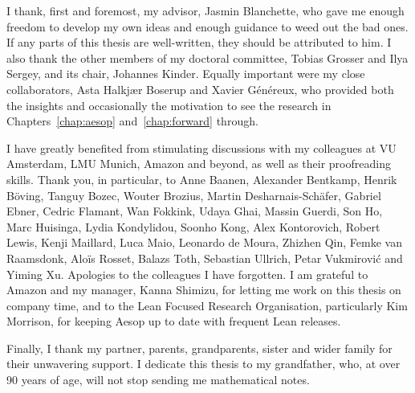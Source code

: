
I thank, first and foremost, my advisor, Jasmin Blanchette, who gave me enough freedom to develop my own ideas and enough guidance to weed out the bad ones.
If any parts of this thesis are well-written, they should be attributed to him.
I also thank the other members of my doctoral committee, Tobias Grosser and Ilya Sergey, and its chair, Johannes Kinder.
Equally important were my close collaborators, Asta Halkjær Boserup and Xavier Généreux, who provided both the insights and occasionally the motivation to see the research in Chapters~\ref{chap:aesop} and~\ref{chap:forward} through.

I have greatly benefited from stimulating discussions with my colleagues at VU Amsterdam, LMU Munich, Amazon and beyond, as well as their proofreading skills.
Thank you, in particular, to Anne Baanen, Alexander Bentkamp, Henrik Böving, Tanguy Bozec, Wouter Brozius, Martin Desharnais-Schäfer, Gabriel Ebner, Cedric Flamant, Wan Fokkink, Udaya Ghai, Massin Guerdi, Son Ho, Marc Huisinga, Lydia Kondylidou, Soonho Kong, Alex Kontorovich, Robert Lewis, Kenji Maillard, Luca Maio, Leonardo de Moura, Zhizhen Qin, Femke van Raamsdonk, Aloïs Rosset, Balazs Toth, Sebastian Ullrich, Petar Vukmirović and Yiming Xu.
Apologies to the colleagues I have forgotten.
I am grateful to Amazon and my manager, Kanna Shimizu, for letting me work on this thesis on company time, and to the Lean Focused Research Organisation, particularly Kim Morrison, for keeping Aesop up to date with frequent Lean releases.

Finally, I thank my partner, parents, grandparents, sister and wider family for their unwavering support.
I dedicate this thesis to my grandfather, who, at over 90 years of age, will not stop sending me mathematical notes.
